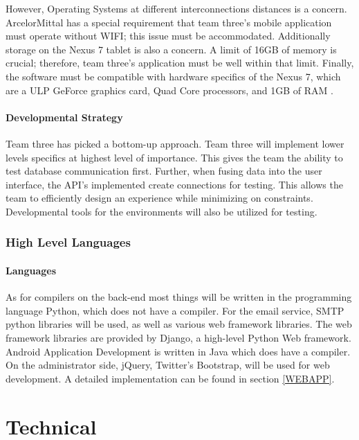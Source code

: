 \documentclass[Letter,11pt]{article}
\begin{document}
	However, Operating Systems at different interconnections distances is a concern. ArcelorMittal has a special requirement that team three's mobile application must operate without WIFI; this issue must be accommodated. Additionally storage on the Nexus 7 tablet is also a concern. A limit of 16GB of memory is crucial; therefore, team three's application must be well within that limit.  Finally, the software must be compatible with hardware specifics of the Nexus 7, which are a ULP GeForce graphics card, Quad Core processors, and 1GB of RAM \cite{nexus7}. \\
	
	\subsection{Developmental Strategy}
	Team three has picked a bottom-up approach. Team three will implement lower levels specifics at highest level of importance. This gives the team the ability to test database communication first. Further, when fusing data into the user interface, the API's implemented create connections for testing. This allows the team to efficiently design an experience while minimizing on constraints. Developmental tools for the environments will also be utilized for testing. \\ 

\section{High Level Languages}\label{highlevel}
	\subsection{Languages}
	As for compilers on the back-end most things will be written in the programming language Python, which does not have a compiler. For the email service, SMTP python libraries will be used, as well as various web framework libraries. The web framework libraries are provided by Django, a high-level Python Web framework. \\
	Android Application Development is written in Java which does have a compiler. On the administrator side, jQuery, Twitter's Bootstrap, will be used for web development.  A detailed implementation can be found in section \ref{WEBAPP}.  \\ 


\part{Technical}
\end{document}
